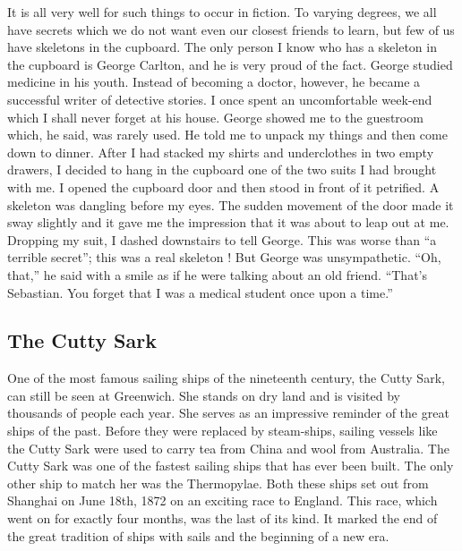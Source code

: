 \documentclass[11pt]{article}
\begin{document}
It is all very well for such things to occur in fiction. To varying degrees, we all have secrets which we do not want even our closest friends to learn, but few of us have skeletons in the cupboard. The only person I know who has a skeleton in the cupboard is George Carlton, and he is very proud of the fact. George studied medicine in his youth. Instead of becoming a doctor, however, he became a successful writer of detective stories. I once spent an uncomfortable week-end which I shall never forget at his house. George showed me to the guestroom which, he said, was rarely used. He told me to unpack my things and then come down to dinner. After I had stacked my shirts and underclothes in two empty drawers, I decided to hang in the cupboard one of the two suits I had brought with me. I opened the cupboard door and then stood in front of it petrified. A skeleton was dangling before my eyes. The sudden movement of the door made it sway slightly and it gave me the impression that it was about to leap out at me. Dropping my suit, I dashed downstairs to tell George. This was worse than ``a terrible secret''; this was a real skeleton ! But George was unsympathetic. ``Oh, that,'' he said with a smile as if he were talking about an old friend. ``That's Sebastian. You forget that I was a medical student once upon a time.'' 
\subsection{The Cutty Sark}
\label{sec-1-25}

One of the most famous sailing ships of the nineteenth century, the Cutty Sark, can still be seen at Greenwich. She stands on dry land and is visited by thousands of people each year. She serves as an impressive reminder of the great ships of the past. Before they were replaced by steam-ships, sailing vessels like the Cutty Sark were used to carry tea from China and wool from Australia. The Cutty Sark was one of the fastest sailing ships that has ever been built. The only other ship to match her was the Thermopylae. Both these ships set out from Shanghai on June 18th, 1872 on an exciting race to England. This race, which went on for exactly four months, was the last of its kind. It marked the end of the great tradition of ships with sails and the beginning of a new era. 
\end{document}
